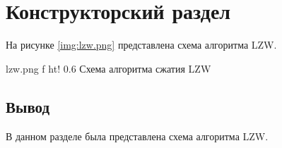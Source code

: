 \chapter{Конструкторский раздел}

На рисунке \ref{img:lzw.png} представлена схема алгоритма LZW.

{lzw.png} %
{f} %
{ht!} %
{0.6\textwidth} %
{Схема алгоритма сжатия LZW} %

\section*{Вывод}

В данном разделе была представлена схема алгоритма LZW.





